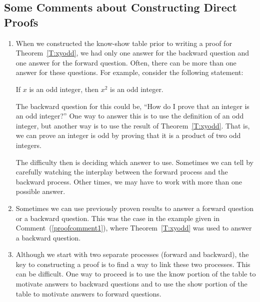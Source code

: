 \subsection*{Some Comments about Constructing Direct Proofs}
%
%
\begin{enumerate}
  \item When we constructed the know-show table prior to writing a proof for Theorem~\ref{T:xyodd}, we had only one answer for the backward question and one answer for the forward question.  Often, there can be more than one answer for these questions.  For example, consider the following statement:
\begin{center}
If  $x$  is an odd integer, then  $x^2$ is an odd integer.
\end{center}
The backward question for this could be, ``How do I prove that an integer is an odd integer?''  One way to answer this is to use the definition of an odd integer, but another way is to use the result of 
Theorem~\ref{T:xyodd}.  That is, we can prove an integer is odd by proving that it is a product of two odd integers.

The difficulty then is deciding which answer to use.  Sometimes we can tell by carefully watching the interplay between the forward process and the backward process.  Other times, we may have to work with more than one possible answer.  
\label{proofcomment1}%

%
%
\item Sometimes we can use previously proven results to answer a forward question or a backward question.  This was the case in the example given in 
Comment~(\ref{proofcomment1}), where Theorem~\ref{T:xyodd} was used to answer a backward question.

\item Although we start with two separate processes (forward and backward), the key to constructing a proof is to find a way to link these two processes.  This can be difficult.  One way to proceed is to use the know portion of the table to motivate answers to backward questions and to use the show portion of the table to motivate answers to forward questions.


\end{enumerate}
